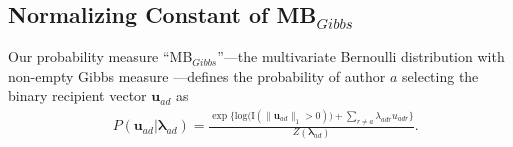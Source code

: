 \documentclass[12pt]{article}
\begin{document}
\begin{appendices}
\section{Normalizing Constant of MB$_{Gibbs}$}\label{sec: non-empty Gibbs measure}
Our probability measure ``MB$_{Gibbs}$''---the multivariate Bernoulli distribution with non-empty Gibbs measure \citep{fellows2017removing}---defines the probability of author $a$ selecting the binary recipient vector $\boldsymbol{u}_{ad}$ as
\begin{equation*} 
\begin{aligned}
& P(\boldsymbol{u}_{ad}|\boldsymbol{\lambda}_{ad} ) = \frac{\exp\Big\{ \mbox{log}\big(\text{I}(\lVert \boldsymbol{u}_{ad} \rVert_1 > 0)\big) + \sum_{r \neq a} \lambda_{adr}u_{adr} \Big\}}{Z(\boldsymbol{\lambda}_{ad})}.
\end{aligned}
\end{equation*}


\end{appendices}
\end{document}
